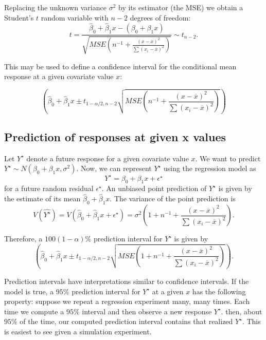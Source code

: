 \documentclass[
]{book}
\begin{document}
Replacing the unknown variance \(\sigma^2\) by its estimator (the MSE) we obtain a Student's \(t\) random variable with \(n-2\) degrees of freedom:
\[t = \frac{\hat\beta_0 + \hat\beta_1 x  - (\beta_0 + \beta_1 x)}{\sqrt{MSE \left(n^{-1} + \frac{(x - \overline x)^2}{\sum (x_i - \overline x)^2}\right)}}\sim t_{n-2}.\]

This may be used to define a confidence interval for the conditional mean response at a given covariate value \(x\):

\[\left(\hat\beta_0 + \hat\beta_1 x \pm t_{1-\alpha/2, n-2}\sqrt{MSE \left(n^{-1} + \frac{(x - \overline x)^2}{\sum (x_i - \overline x)^2}\right)}  \right)\]

\hypertarget{prediction-of-responses-at-given-x-values}{%
\subsection{Prediction of responses at given x values}\label{prediction-of-responses-at-given-x-values}}

Let \(Y^\star\) denote a future response for a given covariate value \(x\). We want to predict \(Y^\star\sim N(\beta_0 + \beta_1 x, \sigma^2)\). Now, we can represent \(Y^\star\) using the regression model as
\[Y^\star = \beta_0 + \beta_1 x + \epsilon^\star\]
for a future random residual \(\epsilon^\star\). An unbiased point prediction of \(Y^\star\) is given by the estimate of its mean \(\hat\beta_0 + \hat\beta_1 x\). The variance of the point prediction is
\[V(\hat{Y^\star}) = V(\hat\beta_0 + \hat\beta_1 x + \epsilon^\star) = \sigma^2\left(1 +n^{-1} + \frac{(x - \overline x)^2}{\sum (x_i - \overline x)^2}\right).\]

Therefore, a \(100(1-\alpha)\%\) prediction interval for \(Y^\star\) is given by
\[\left(\hat\beta_0 + \hat\beta_1 x \pm t_{1-\alpha/2, n-2}\sqrt{MSE \left(1 +n^{-1} + \frac{(x - \overline x)^2}{\sum (x_i - \overline x)^2}\right)}  \right).\]

Prediction intervals have interpretations similar to confidence intervals. If the model is true, a \(95\%\) prediction interval for \(Y^\star\) at a given \(x\) has the following property: suppose we repeat a regression experiment many, many times. Each time we compute a \(95\%\) interval and then observe a new response \(Y^\star\). then, about \(95\%\) of the time, our computed prediction interval contains that realized \(Y^\star\). This is easiest to see given a simulation experiment.
\end{document}
